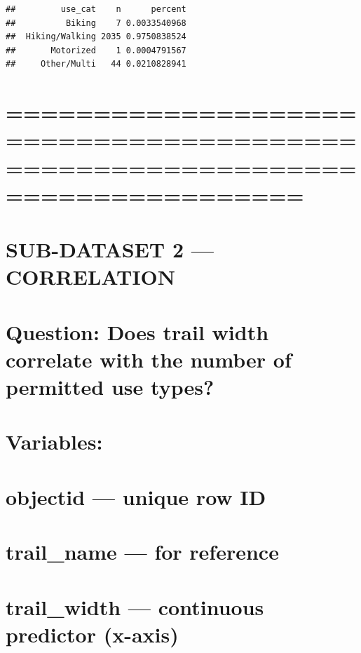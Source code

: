 \documentclass[
]{article}
\begin{document}
\begin{verbatim}
##         use_cat    n      percent
##          Biking    7 0.0033540968
##  Hiking/Walking 2035 0.9750838524
##       Motorized    1 0.0004791567
##     Other/Multi   44 0.0210828941
\end{verbatim}

\section{=============================================================================}\label{section-12}

\section{SUB-DATASET 2 --- CORRELATION}\label{sub-dataset-2-correlation}

\section{Question: Does trail width correlate with the number of
permitted use
types?}\label{question-does-trail-width-correlate-with-the-number-of-permitted-use-types}

\section{}\label{section-13}

\section{Variables:}\label{variables-1}

\section{objectid --- unique row ID}\label{objectid-unique-row-id-1}

\section{trail\_name --- for reference}\label{trail_name-for-reference}

\section{trail\_width --- continuous predictor
(x-axis)}\label{trail_width-continuous-predictor-x-axis}
\end{document}
